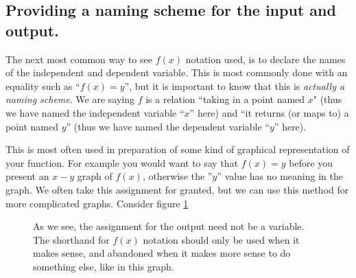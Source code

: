 \documentclass{ximeraXloud}
\begin{document}
        \subsection*{Providing a naming scheme for the input and output.}
        The next most common way to see $f(x)$ notation used, is to declare the names of the independent and dependent variable. This is most commonly done with an equality such as ``$f(x) = y$'', but it is important to know that this is \textit{actually a naming scheme}. We are saying $f$ is a relation ``taking in a point named $x$" (thus we have named the independent variable ``$x$'' here) and ``it returns (or maps to) a point named $y$'' (thus we have named the dependent variable ``$y$'' here). 
        
        This is most often used in preparation of some kind of graphical representation of your function. For example you would want to say that $f(x) = y$ before you present an $x-y$ graph of $f(x)$, otherwise the ''$y$'' value has no meaning in the graph. We often take this assignment for granted, but we can use this method for more complicated graphs. Consider figure \ref{profitProjections}
        
        \begin{figure}[h]
            \begin{center}
            \end{center}
            \caption{
                As we see, the assignment for the output need not be a variable. The shorthand for $f(x)$ notation should only be used when it makes sense, and abandoned when it makes more sense to do something else, like in this graph.
            }
            \label{profitProjections}
        \end{figure}
            
\end{document}
